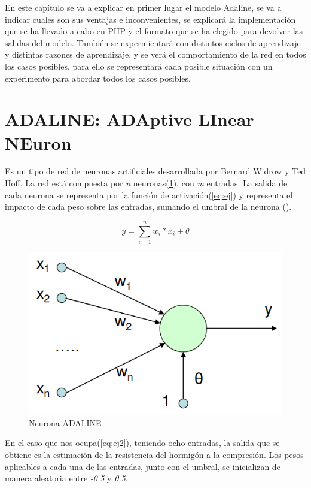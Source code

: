 \documentclass[11pt,spanish,listoffigures,listoftables]{tfgetsinf}
\begin{document}
\par En este capítulo se va a explicar en primer lugar el modelo Adaline, se va a indicar cuales son sus ventajas e inconvenientes, se explicará la implementación que se ha llevado a cabo en PHP y el formato que se ha elegido para devolver las salidas del modelo. También se expermientará con distintos ciclos de aprendizaje y distintas razones de aprendizaje, y se verá el comportamiento de la red en todos los casos posibles, para ello se representará cada posible situación con un experimento para abordar todos los casos posibles.

\section{ADALINE: ADAptive LInear NEuron}

\par Es un tipo de red de neuronas artificiales desarrollada por Bernard Widrow y Ted Hoff. La red está compuesta por \textit{n} neuronas(\ref{fig:adaline}), con \textit{m} entradas. La salida de cada neurona se representa por la función de activación(\ref{eq:ej}) y representa el impacto de cada peso sobre las entradas, sumando el umbral de la neurona (\theta).

\begin{equation}\label{eq:ej}
y = \sum_{i=1}^{n}w_{i}*x_{i} + \theta
\end{equation}

\begin{figure}
\centering
\includegraphics[scale=0.5]{adaline}
\caption{Neurona ADALINE \cite{Adaline}}\label{fig:adaline}
\end{figure}

\par En el caso que nos ocupa(\ref{eq:ej2}), teniendo ocho entradas, la salida que se obtiene es la estimación de la resistencia del hormigón a la compresión. Los pesos aplicables a cada una de las entradas, junto con el umbral, se inicializan de manera aleatoria entre \textit{-0.5} y \textit{0.5}.
\end{document}
